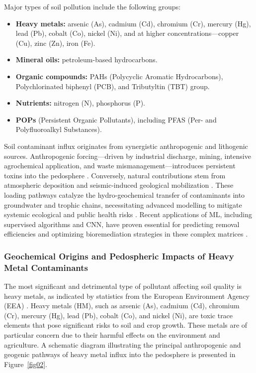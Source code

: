 \documentclass[preprint,12pt]{elsarticle}            %
\begin{document}
Major types of soil pollution include the following groups:

\begin{itemize}
    \item \textbf{Heavy metals:} arsenic (As), cadmium (Cd), chromium (Cr),
        mercury (Hg), lead (Pb), cobalt (Co), nickel (Ni), and at higher
        concentrations---copper (Cu), zinc (Zn), iron (Fe).
    \item \textbf{Mineral oils:} petroleum-based hydrocarbons.
    \item \textbf{Organic compounds:} PAHs (Polycyclic Aromatic
        Hydrocarbons), Polychlorinated biphenyl (PCB), and Tributyltin
        (TBT) group.
    \item \textbf{Nutrients:} nitrogen (N), phosphorus (P).
    \item \textbf{POPs} (Persistent Organic Pollutants), including PFAS
        (Per- and Polyfluoroalkyl Substances).
\end{itemize}

Soil contaminant influx originates from synergistic anthropogenic and
lithogenic sources. Anthropogenic forcing---driven by industrial discharge,
mining, intensive agrochemical application, and waste mismanagement---introduces
persistent toxins into the pedosphere \cite{Bwandamuka2025,Latif2026}.
Conversely, natural contributions stem from atmospheric deposition and
seismic-induced geological mobilization \cite{Binetti2026,Latif2026}. These
loading pathways catalyze the hydro-geochemical transfer of contaminants into
groundwater and trophic chains, necessitating advanced modelling to mitigate
systemic ecological and public health risks
\cite{Elmotawakkil2025,Sanad2026}. Recent applications of ML, including
supervised algorithms and CNN, have proven essential for predicting removal
efficiencies and optimizing bioremediation strategies in these complex matrices
\cite{Okafor2026,Pace2026}.

\subsubsection{Geochemical Origins and Pedospheric Impacts of Heavy Metal
    Contaminants}\label{sec2.1.1}

The most significant and detrimental type of pollutant affecting soil quality
is heavy metals, as indicated by statistics from the European Environment
Agency (EEA) \cite{EEA2009}. Heavy metals (HM), such as arsenic (As),
cadmium (Cd), chromium (Cr), mercury (Hg), lead (Pb), cobalt (Co), and
nickel (Ni), are toxic trace elements that pose significant risks to soil and
crop growth. These metals are of particular concern due to their harmful
effects on the environment and agriculture. A schematic diagram illustrating
the principal anthropogenic and geogenic pathways of heavy metal influx into
the pedosphere is presented in Figure~\ref{fig02}.
\end{document}
